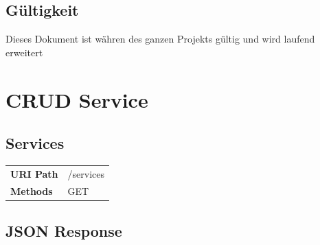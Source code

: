 \documentclass[11pt]{scrartcl}
\begin{document}
\subsection{Gültigkeit}
Dieses Dokument ist währen des ganzen Projekts gültig und wird laufend erweitert

\newpage

\section{CRUD Service}
\subsection{Services}
\begin{tabularx}{\linewidth}{l l}
\textbf{URI Path} & /services\\
\textbf{Methods} & GET\\
\end{tabularx}

\subsection{JSON Response}
\end{document}
